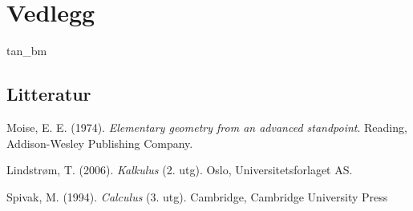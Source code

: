 	\chapter*{Vedlegg}
	{tan_bm}
	

	
	\newpage
	\section*{Litteratur}
	Moise, E. E. (1974). \textit{Elementary geometry from an advanced standpoint}. Reading, Addison-Wesley Publishing Company.\vsk
	
	Lindstrøm, T. (2006). \textit{Kalkulus} (2. utg). Oslo, Universitetsforlaget AS.\vsk
	
	Spivak, M. (1994). \textit{Calculus} (3. utg). Cambridge, Cambridge University Press
	
	


